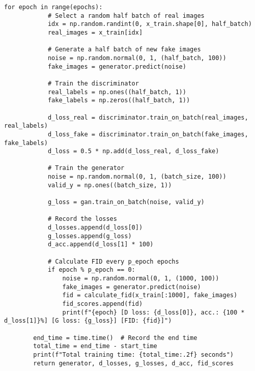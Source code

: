 \begin{lstlisting}[style=mypython, caption=Explore GAN with more convolutional layers 3]
        for epoch in range(epochs):
            # Select a random half batch of real images
            idx = np.random.randint(0, x_train.shape[0], half_batch)
            real_images = x_train[idx]
    
            # Generate a half batch of new fake images
            noise = np.random.normal(0, 1, (half_batch, 100))
            fake_images = generator.predict(noise)
    
            # Train the discriminator
            real_labels = np.ones((half_batch, 1))
            fake_labels = np.zeros((half_batch, 1))
    
            d_loss_real = discriminator.train_on_batch(real_images, real_labels)
            d_loss_fake = discriminator.train_on_batch(fake_images, fake_labels)
            d_loss = 0.5 * np.add(d_loss_real, d_loss_fake)
    
            # Train the generator
            noise = np.random.normal(0, 1, (batch_size, 100))
            valid_y = np.ones((batch_size, 1))
    
            g_loss = gan.train_on_batch(noise, valid_y)
    
            # Record the losses
            d_losses.append(d_loss[0])
            g_losses.append(g_loss)
            d_acc.append(d_loss[1] * 100)
            
            # Calculate FID every p_epoch epochs
            if epoch % p_epoch == 0:
                noise = np.random.normal(0, 1, (1000, 100))
                fake_images = generator.predict(noise)
                fid = calculate_fid(x_train[:1000], fake_images)
                fid_scores.append(fid)
                print(f"{epoch} [D loss: {d_loss[0]}, acc.: {100 * d_loss[1]}%] [G loss: {g_loss}] [FID: {fid}]")
    
        end_time = time.time()  # Record the end time
        total_time = end_time - start_time
        print(f"Total training time: {total_time:.2f} seconds")
        return generator, d_losses, g_losses, d_acc, fid_scores
    
\end{lstlisting}

